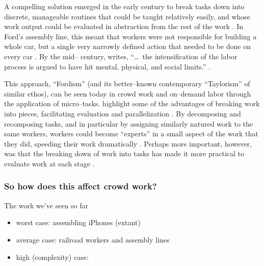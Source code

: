 \documentclass[trackingWork]{subfiles}
\begin{document}
{A compelling solution emerged in the early  century to break tasks down into discrete,  manageable routines that could be taught relatively easily,  and whose work output could be evaluated in abstraction from the rest of the work
\cite{restructuringPieceworkBaker}.
In Ford's assembly line, this meant that workers were not responsible for building a whole car,  but a single very narrowly defined action that needed to be done on every car
\cite{towardsGlobalFordism}.
By the mid-- century, \citeauthor{schoenberger1988fordism} writes,  ``\dots~the intensification of the labor process is argued to have hit mental, physical, and social limits.''
\cite{schoenberger1988fordism}.

This approach, ``Fordism'' (and its better--known contemporary ``Taylorism'' of similar ethos),  can be seen today in crowd work and on--demand labor through the application of micro--tasks.
\citeauthor{writingMicroTasks} highlight some of the advantages of breaking work into pieces,  facilitating evaluation and parallelization
\cite{writingMicroTasks}.
By decomposing and recomposing tasks,  and in particular by assigning similarly natured work to the same workers,  workers could become ``experts'' in a small aspect of the work that they did,  speeding their work dramatically
\cite{delayAndOrderLasecki}.
Perhaps more important, however, was that
the breaking down of work into tasks has made it more practical to evaluate work at each stage
\cite{rogstadius2011assessment}.

\subsubsection{So how does this affect crowd work?}
The work we've seen so far 
\begin{itemize}
  \item worst case: assembling iPhones (extant)
  \item average case: railroad workers and assembly lines
  \item high (complexity) case: 
\end{itemize}



}
\end{document}
